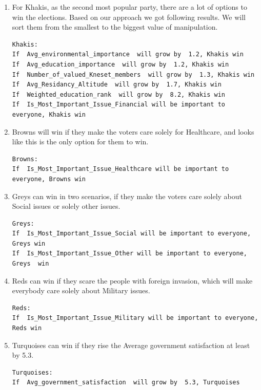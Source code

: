 \documentclass[12pt]{article}
\begin{document}
\begin{enumerate}

\item For Khakis, as the second most popular party, there are a lot of options to win the elections. Based on our approach we got following results. We will sort them from the smallest to the biggest value of manipulation.
\begin{verbatim}
Khakis:
If  Avg_environmental_importance  will grow by  1.2, Khakis win
If  Avg_education_importance  will grow by  1.2, Khakis win
If  Number_of_valued_Kneset_members  will grow by  1.3, Khakis win
If  Avg_Residancy_Altitude  will grow by  1.7, Khakis win
If  Weighted_education_rank  will grow by  8.2, Khakis win
If  Is_Most_Important_Issue_Financial will be important to everyone, Khakis win
\end{verbatim}

\item Browns will win if they make the voters care solely for Healthcare, and looks like this is the only option for them to win.  
\begin{verbatim}
Browns:
If  Is_Most_Important_Issue_Healthcare will be important to everyone, Browns win
\end{verbatim}

\item Greys can win in two scenarios, if they make the voters care solely about Social issues or solely other issues. 
\begin{verbatim}
Greys:
If  Is_Most_Important_Issue_Social will be important to everyone, Greys win
If  Is_Most_Important_Issue_Other will be important to everyone, Greys  win
\end{verbatim}

\item Reds can win if they scare the people with foreign invasion, which will make everybody care solely about Military issues. 
\begin{verbatim}
Reds:
If  Is_Most_Important_Issue_Military will be important to everyone, Reds win
\end{verbatim}

\item Turquoises can win if they rise the Average government satisfaction at least by 5.3.
\begin{verbatim}
Turquoises:
If  Avg_government_satisfaction  will grow by  5.3, Turquoises
\end{verbatim}

\end{enumerate}
\end{document}
